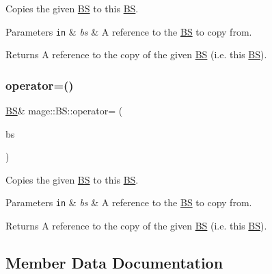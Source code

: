 Copies the given \hyperlink{structmage_1_1_b_s}{BS} to this \hyperlink{structmage_1_1_b_s}{BS}.


\begin{DoxyParams}[1]{Parameters}
\mbox{\tt in}  & {\em bs} & A reference to the \hyperlink{structmage_1_1_b_s}{BS} to copy from. \\
\hline
\end{DoxyParams}
\begin{DoxyReturn}{Returns}
A reference to the copy of the given \hyperlink{structmage_1_1_b_s}{BS} (i.\+e. this \hyperlink{structmage_1_1_b_s}{BS}). 
\end{DoxyReturn}
\hypertarget{structmage_1_1_b_s_a751360f4d52fe40f6f07f29a759c9f0c}{}\label{structmage_1_1_b_s_a751360f4d52fe40f6f07f29a759c9f0c} 
\subsubsection{\texorpdfstring{operator=()}{operator=()}\hspace{0.1cm}{\footnotesize\ttfamily [2/2]}}
{\footnotesize\ttfamily \hyperlink{structmage_1_1_b_s}{BS}\& mage\+::\+B\+S\+::operator= (\begin{DoxyParamCaption}\item[{\hyperlink{structmage_1_1_b_s}{BS} \&\&}]{bs }\end{DoxyParamCaption})\hspace{0.3cm}{\ttfamily [default]}}

Copies the given \hyperlink{structmage_1_1_b_s}{BS} to this \hyperlink{structmage_1_1_b_s}{BS}.


\begin{DoxyParams}[1]{Parameters}
\mbox{\tt in}  & {\em bs} & A reference to the \hyperlink{structmage_1_1_b_s}{BS} to copy from. \\
\hline
\end{DoxyParams}
\begin{DoxyReturn}{Returns}
A reference to the copy of the given \hyperlink{structmage_1_1_b_s}{BS} (i.\+e. this \hyperlink{structmage_1_1_b_s}{BS}). 
\end{DoxyReturn}


\subsection{Member Data Documentation}
\hypertarget{structmage_1_1_b_s_a6d63fae8fd20d26587ebd11efb1789d2}{}\label{structmage_1_1_b_s_a6d63fae8fd20d26587ebd11efb1789d2} 
